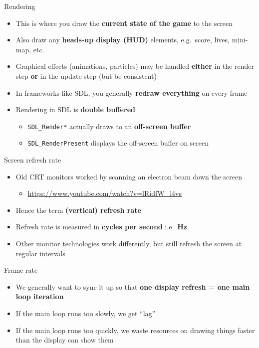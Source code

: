 \begin{frame}{Rendering}
    \begin{itemize}
        \item This is where you draw the \textbf{current state of the game} to the screen
        \item Also draw any \textbf{heads-up display (HUD)} elements, e.g.\ score, lives, mini-map, etc.
        \item Graphical effects (animations, particles) may be handled \textbf{either} in the render step
            \textbf{or} in the update step (but be consistent)
        \item In frameworks like SDL, you generally \textbf{redraw everything} on every frame
        \item Rendering in SDL is \textbf{double buffered}
            \begin{itemize}
                \item \lstinline{SDL_Render*} actually draws to an \textbf{off-screen buffer}
                \item \lstinline{SDL_RenderPresent} displays the off-screen buffer on screen
            \end{itemize}
    \end{itemize}
\end{frame}

\begin{frame}{Screen refresh rate}
    \begin{itemize}
        \item Old CRT monitors worked by scanning an electron beam down the screen
            \begin{itemize}
                \item \url{https://www.youtube.com/watch?v=lRidfW_l4vs}
            \end{itemize}
        \item Hence the term \textbf{(vertical) refresh rate}
        \item Refresh rate is measured in \textbf{cycles per second} i.e.\ \textbf{Hz}
        \item Other monitor technologies work differently, but still refresh the screen at regular intervals
    \end{itemize}
\end{frame}

\begin{frame}{Frame rate}
    \begin{itemize}
        \item We generally want to sync it up so that \newline
            \textbf{one display refresh = one main loop iteration}
        \item If the main loop runs too slowly, we get ``lag''
        \item If the main loop runs too quickly, we waste resources on drawing things faster than the display can show them
    \end{itemize}
\end{frame}

